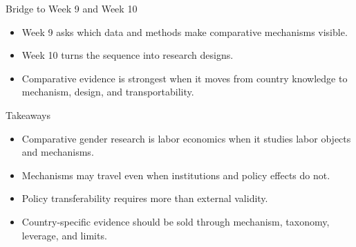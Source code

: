 \documentclass[aspectratio=169,11pt]{beamer}
\begin{document}
\begin{frame}{Bridge to Week 9 and Week 10}
\begin{itemize}
    \item Week 9 asks which data and methods make comparative mechanisms visible.
    \item Week 10 turns the sequence into research designs.
    \item Comparative evidence is strongest when it moves from country knowledge to mechanism, design, and transportability.
\end{itemize}
\end{frame}

\begin{frame}{Takeaways}
\begin{itemize}
    \item Comparative gender research is labor economics when it studies labor objects and mechanisms.
    \item Mechanisms may travel even when institutions and policy effects do not.
    \item Policy transferability requires more than external validity.
    \item Country-specific evidence should be sold through mechanism, taxonomy, leverage, and limits.
\end{itemize}
\end{frame}
\end{document}
